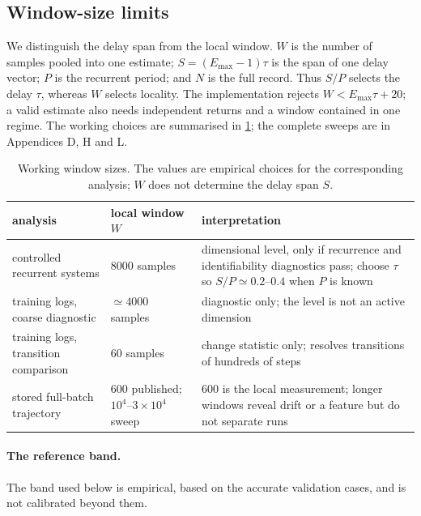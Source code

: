 \documentclass[twoside]{article}
\newenvironment{claude}{\color{claudecolor}}{}
\begin{document}
\begin{claude}
\subsection{Window-size limits}\label{sec:window-limits}

We distinguish the delay span from the local window. $W$ is the number of samples pooled into one
estimate; $S=(E_{\max}-1)\tau$ is the span of one delay vector; $P$ is the recurrent period; and
$N$ is the full record. Thus $S/P$ selects the delay $\tau$, whereas $W$ selects locality. The
implementation rejects $W<E_{\max}\tau+20$; a valid estimate also needs independent returns and
a window contained in one regime. The working choices are summarised in \cref{tab:window-main};
the complete sweeps are in Appendices D, H and L.

\begin{table}[t]
\centering
\footnotesize
\setlength{\tabcolsep}{4pt}
\caption{Working window sizes. The values are empirical choices for the corresponding analysis;
$W$ does not determine the delay span $S$.}
\label{tab:window-main}
\begin{tabularx}{\linewidth}{@{}>{\raggedright\arraybackslash}p{.25\linewidth}
>{\raggedright\arraybackslash}p{.18\linewidth}X@{}}
\toprule
analysis & local window $W$ & interpretation \\
\midrule
controlled recurrent systems & $8000$ samples & dimensional level, only if recurrence and identifiability diagnostics pass; choose $\tau$ so $S/P\simeq0.2$--$0.4$ when $P$ is known \\
\addlinespace
training logs, coarse diagnostic & $\simeq4000$ samples & diagnostic only; the level is not an active dimension \\
\addlinespace
training logs, transition comparison & $60$ samples & change statistic only; resolves transitions of hundreds of steps \\
\addlinespace
stored full-batch trajectory & $600$ published; $10^4$--$3\times10^4$ sweep & $600$ is the local measurement; longer windows reveal drift or a feature but do not separate runs \\
\bottomrule
\end{tabularx}
\end{table}
\end{claude}

\begin{claude}
\paragraph{The reference band.}\label{sec:diagnostics-validated} The band used below is empirical,
based on the accurate validation cases, and is not calibrated beyond them.
\end{claude}
\end{document}
